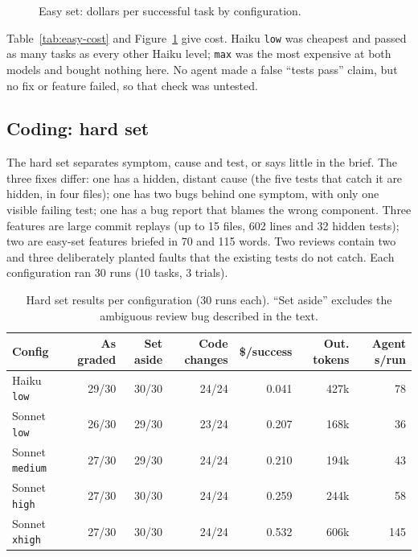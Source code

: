 \begin{figure}[H]
\centering

\caption{Easy set: dollars per successful task by configuration.}
\label{fig:easy-cost}
\end{figure}

Table~\ref{tab:easy-cost} and Figure~\ref{fig:easy-cost} give cost. Haiku \texttt{low} was cheapest and passed as many tasks as every other Haiku level; \texttt{max} was the most expensive at both models and bought nothing here. No agent made a false ``tests pass'' claim, but no fix or feature failed, so that check was untested.

\subsection{Coding: hard set}\label{sec:exp-hard}

The hard set separates symptom, cause and test, or says little in the brief. The three fixes differ: one has a hidden, distant cause (the five tests that catch it are hidden, in four files); one has two bugs behind one symptom, with only one visible failing test; one has a bug report that blames the wrong component. Three features are large commit replays (up to 15 files, 602 lines and 32 hidden tests); two are easy-set features briefed in 70 and 115 words. Two reviews contain two and three deliberately planted faults that the existing tests do not catch. Each configuration ran 30 runs (10 tasks, 3 trials).

\begin{table}[H]
\centering
\caption{Hard set results per configuration (30 runs each). ``Set aside'' excludes the ambiguous review bug described in the text.}
\label{tab:hard-results}
\small
\setlength{\tabcolsep}{4pt}
\begin{tabular}{l r r r r r r}
\toprule
\textbf{Config} & \textbf{As graded} & \textbf{Set aside} & \textbf{Code changes} & \textbf{\$/success} & \textbf{Out. tokens} & \textbf{Agent s/run} \\
\midrule
Haiku \texttt{low}     & 29/30 & 30/30 & 24/24 & 0.041 & 427k & 78  \\
Sonnet \texttt{low}    & 26/30 & 29/30 & 23/24 & 0.207 & 168k & 36  \\
Sonnet \texttt{medium} & 27/30 & 29/30 & 24/24 & 0.210 & 194k & 43  \\
Sonnet \texttt{high}   & 27/30 & 30/30 & 24/24 & 0.259 & 244k & 58  \\
Sonnet \texttt{xhigh}  & 27/30 & 30/30 & 24/24 & 0.532 & 606k & 145 \\
\bottomrule
\end{tabular}
\end{table}

